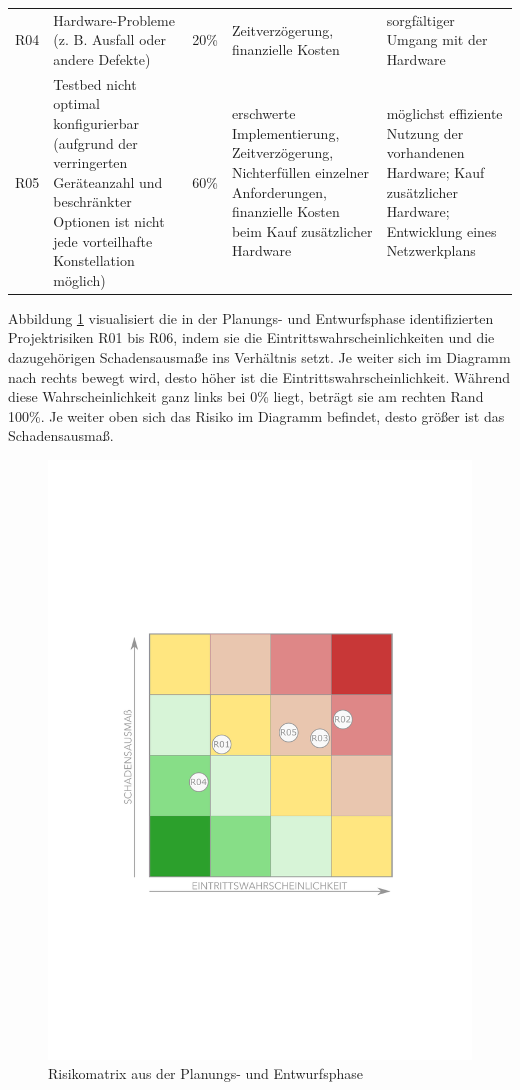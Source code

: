 \documentclass[../review_3.tex]{subfiles}
\begin{document}
\begin{longtable}[h]{l p{} p{} p{} p{}}
    R04         & Hardware-Probleme (z. B. Ausfall oder andere Defekte)                                                                                                     & 20\%                                  & Zeitverzögerung, finanzielle Kosten                                                                                                                              & sorgfältiger Umgang mit der Hardware                                                                                                                                                                                         \\
    R05         & Testbed nicht optimal konfigurierbar (aufgrund der verringerten Geräteanzahl und beschränkter Optionen ist nicht jede vorteilhafte Konstellation möglich) & 60\%                                  & erschwerte Implementierung, Zeitverzögerung, Nichterfüllen einzelner Anforderungen, finanzielle Kosten beim Kauf zusätzlicher Hardware                           & möglichst effiziente Nutzung der vorhandenen Hardware; Kauf zusätzlicher Hardware; Entwicklung eines Netzwerkplans                                                                                                           \\ \bottomrule
\end{longtable}

Abbildung \ref{riskomatrix} visualisiert die in der Planungs- und Entwurfsphase identifizierten Projektrisiken R01 bis R06, indem sie die Eintrittswahrscheinlichkeiten und die dazugehörigen Schadensausmaße ins Verhältnis setzt. Je weiter sich im Diagramm nach rechts bewegt wird, desto höher ist die Eintrittswahrscheinlichkeit. Während diese Wahrscheinlichkeit ganz links bei 0\% liegt, beträgt sie am rechten Rand 100\%. Je weiter oben sich das Risiko im Diagramm befindet, desto größer ist das Schadensausmaß.

\begin{figure} [H]
    \centering
    \includegraphics[width = 0.5\linewidth]{img/risikomatrix.pdf}
    \caption{Risikomatrix aus der Planungs- und Entwurfsphase}
    \label{riskomatrix}
\end{figure}
\end{document}
